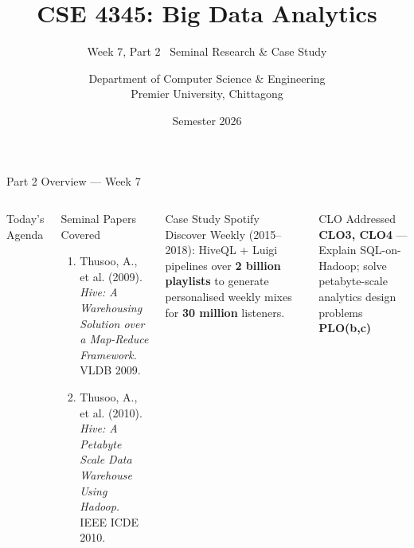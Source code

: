 \documentclass[aspectratio=169,10pt]{beamer}
\title[CSE 4345 \textbar{} Week 7, Part 2]{CSE 4345: Big Data Analytics}
\subtitle{Week 7, Part 2 \textemdash\ Seminal Research \& Case Study}
\author[Dept.\ of CSE]{Department of Computer Science \& Engineering\\[4pt]
       \small Premier University, Chittagong}
\institute{}
\date{Semester 2026}
\begin{document}

\begin{frame}
  \titlepage
\end{frame}

\begin{frame}{Part 2 Overview — Week 7}
  \begin{columns}[T]
      \begin{block}{Today's Agenda}
        \tableofcontents
      \end{block}

      \begin{exampleblock}{Seminal Papers Covered}
        \begin{enumerate}
          \item Thusoo, A., et al. (2009).
                \textit{Hive: A Warehousing Solution over a
                Map-Reduce Framework.} VLDB 2009.
          \item Thusoo, A., et al. (2010).
                \textit{Hive: A Petabyte Scale Data Warehouse
                Using Hadoop.} IEEE ICDE 2010.
        \end{enumerate}
      \end{exampleblock}
      \vspace{6pt}
      \begin{alertblock}{Case Study}
        Spotify Discover Weekly (2015--2018):
        HiveQL + Luigi pipelines over \textbf{2 billion playlists}
        to generate personalised weekly mixes for
        \textbf{30 million} listeners.
      \end{alertblock}
      \vspace{4pt}
      \begin{block}{CLO Addressed}
        \textbf{CLO3, CLO4} — Explain SQL-on-Hadoop; solve
        petabyte-scale analytics design problems\\
        \textbf{PLO(b,c)}
      \end{block}
  \end{columns}
\end{frame}

\end{document}
